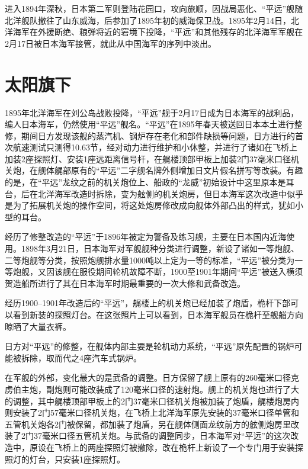 \documentclass[12pt,UTF8]{ctexbook}
\begin{document}
进入1894年深秋，日本第二军则登陆花园口，攻向旅顺，因战局恶化、“平远”舰随北洋舰队撤往了山东威海，后参加了1895年初的威海保卫战。1895年2月14日，北洋海军在外援断绝、粮弹将近的窘境下投降，“平远”和其他残存的北洋海军军舰在2月17日被日本海军接管，就此从中国海军的序列中淡出。

\section{太阳旗下}

1895年北洋海军在刘公岛战败投降，“平远”舰于2月17日成为日本海军的战利品，编人日本海军，仍然使用“平远”舰名。“平远”在1895年春天被送回日本本土进行整修，期间日方发现该舰的蒸汽机、钢炉存在老化和部件缺损等问题，日方进行的首次航速测试只测得10.63节，经对动力进行维护和小休整，并进行了诸如在飞桥上加装2座探照灯、安装1座远距离信号杆，在艉楼顶部甲板上加装2门37毫米口径机关炮，在舰体艉部原有的“平远”二字舰名牌外侧增加日文片假名拼写等改装。有趣的是，在“平远”龙纹之前的机关炮位上、船政的“龙威”初始设计中这里原本是耳台，后在北洋海军改造时拆除，变为舷侧的机关炮房，但日本海军这次改造中似乎是为了拓展机关炮的操作空间，将这处炮房修改成向舰体外部凸出的样式，犹如小型的耳台。

经历了修整改造的“平远”于1896年被定为警备及练习舰，主要在日本国内近海使用。1898年3月21日，日本海军对军舰舰种分类进行调整，新设了诸如一等炮舰、二等炮舰等分类，按照炮舰排水量1000吨以上定为一等的标准，“平远”被分类为一等炮舰，又因该舰在服役期间轮机故障不断，1900至1901年期间“平远”被送入横须贺造船所进行了其在日本海军时期最重要的一次大修和武备改造。

经历1900--1901年改造后的“平远”，艉楼上的机关炮已经加装了炮盾，桅杆下部可以看到新装的探照灯台。在这张照片上可以看到，日本海军舰员在桅杆至舰艏方向晾晒了大量衣裤。

日方对“平远”的修整，在舰体内部主要是轮机动力系统，“平远”原先配置的锅炉可能被拆除，取而代之4座汽车式锅炉。

在军舰的外部，变化最大的是武备的调整。日方保留了舰上原有的260毫米口径克虏伯主炮，副炮则可能改装成了120毫米口径的速射炮。舰上的机关炮也进行了大的调整，其中艉楼顶部甲板上的2门37毫米口径机关炮被加装了炮盾，艉楼炮房内则安装了2门57毫米口径机关炮，在飞桥上北洋海军原先安装的37毫米口径单管和五管机关炮各2门被保留，都加装了炮盾，另在舰体侧面龙纹前方的舷侧炮房里改装了2门37毫米口径五管机关炮。与武备的调整同步，日本海军对“平远”的这次改造中，原设在飞桥上的两座探照灯被撤除，改在桅杆上新设了一个专门用于安装探照灯的灯台，只安装1座探照灯。
\end{document}
